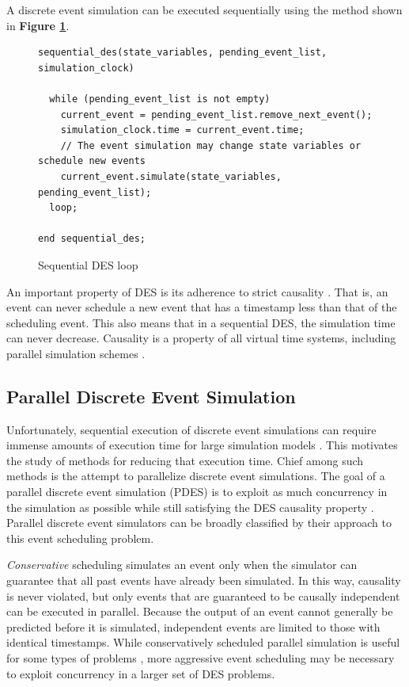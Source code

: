 \documentclass[11pt]{book}
\begin{document}
A discrete event simulation can be executed sequentially using the method shown
in \textbf{Figure \ref{sequential-des}}.

\begin{figure}[h]
\centering
\begin{verbatim}
sequential_des(state_variables, pending_event_list, simulation_clock)

  while (pending_event_list is not empty)
    current_event = pending_event_list.remove_next_event();
    simulation_clock.time = current_event.time;
    // The event simulation may change state variables or schedule new events
    current_event.simulate(state_variables, pending_event_list);
  loop;

end sequential_des;
\end{verbatim}
\caption{Sequential DES loop \cite{jacob-13}}
\label{sequential-des}
\end{figure}

An important property of DES is its adherence to strict causality
\cite{fujimoto-pdes}. That is, an event can never schedule a new event that has
a timestamp less than that of the scheduling event. This also means that in a
sequential DES, the simulation time can never decrease. Causality is a property
of all virtual time systems, including parallel simulation schemes
\cite{lamport-78}.

\subsection{\textbf{Parallel Discrete Event Simulation}}

Unfortunately, sequential execution of discrete event simulations can require
immense amounts of execution time for large simulation models
\cite{fujimoto-pdes}. This motivates the study of methods for reducing that
execution time. Chief among such methods is the attempt to parallelize discrete
event simulations. The goal of a parallel discrete event simulation (PDES) is to
exploit as much concurrency in the simulation as possible while still satisfying
the DES causality property \cite{fujimoto-89b}. Parallel discrete event
simulators can be broadly classified by their approach to this event scheduling
problem.

\textit{Conservative} scheduling simulates an event only when the simulator can
guarantee that all past events have already been simulated. In this way,
causality is never violated, but only events that are guaranteed to be causally
independent can be executed in parallel. Because the output of an event cannot
generally be predicted before it is simulated, independent events are limited to
those with identical timestamps. While conservatively scheduled parallel
simulation is useful for some types of problems \cite{nicol-93b}, more
aggressive event scheduling may be necessary to exploit concurrency in a larger
set of DES problems.
\end{document}
